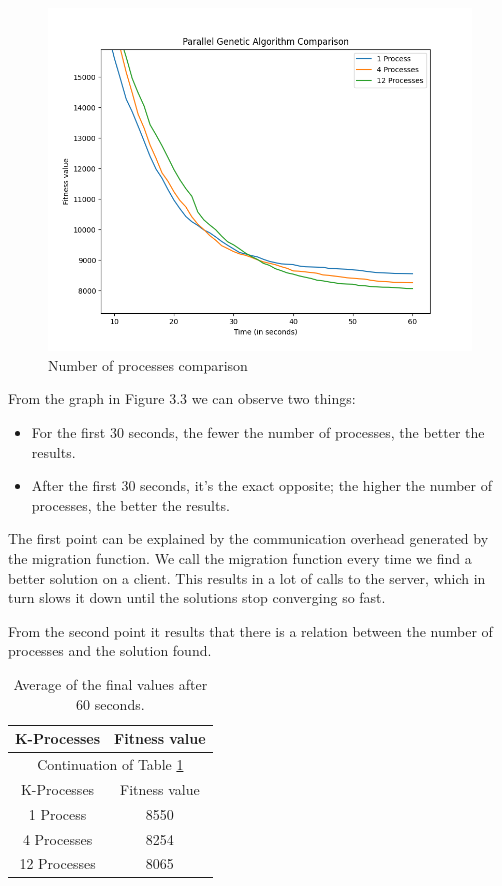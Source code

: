 \begin{figure}[ht]
\includegraphics[width=\textwidth]{images/results.png}
\caption{Number of processes comparison}
\end{figure}
\newpage
\noindent
From the graph in Figure 3.3 we can observe two things:
\begin{itemize}
    \item For the first 30 seconds, the fewer the number of processes, the better the results.
    \item After the first 30 seconds, it's the exact opposite; the higher the number of processes, the better the results.
\end{itemize}
\par
The first point can be explained by the communication overhead generated by the migration function. We call the migration function every time we find a better solution on a client. This results in a lot of calls to the server, which in turn slows it down until the solutions stop converging so fast.
\par
From the second point it results that there is a relation between the number of processes and the solution found.
\newline
 \begin{longtable}[c]{| c | c |}
 \caption{Average of the final values after 60 seconds.\label{long}}\\
 \hline
 K-Processes & Fitness value\\
 \hline
 \endfirsthead

 \hline
 \multicolumn{2}{|c|}{Continuation of Table \ref{long}}\\
 \hline
 K-Processes & Fitness value\\
 \hline
 \endhead

 \hline
 \endfoot

 1 Process & 8550\\
4 Processes & 8254\\
 12 Processes & 8065\\
 \end{longtable}
